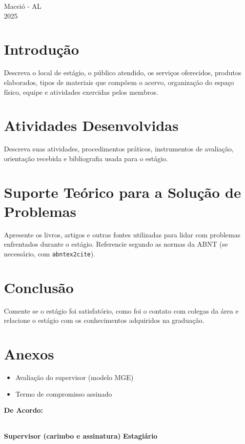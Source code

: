 \documentclass[12pt,a4paper]{article}
\begin{document}
	\vfill
	\begin{flushright}
		Maceió - AL \\
		2025
	\end{flushright}
	
	\newpage
	

	
	\section{Introdução}
	
	Descreva o local de estágio, o público atendido, os serviços oferecidos, produtos elaborados, tipos de materiais que compõem o acervo, organização do espaço físico, equipe e atividades exercidas pelos membros.
	
	\section{Atividades Desenvolvidas}
	
	Descreva suas atividades, procedimentos práticos, instrumentos de avaliação, orientação recebida e bibliografia usada para o estágio.
	
	\section{Suporte Teórico para a Solução de Problemas}
	
	Apresente os livros, artigos e outras fontes utilizadas para lidar com problemas enfrentados durante o estágio. Referencie segundo as normas da ABNT (se necessário, com \texttt{abntex2cite}).
	
	\section{Conclusão}
	
	Comente se o estágio foi satisfatório, como foi o contato com colegas da área e relacione o estágio com os conhecimentos adquiridos na graduação.
	
	\section{Anexos}
	
	\begin{itemize}
		\item Avaliação do supervisor (modelo MGE)
		\item Termo de compromisso assinado
	\end{itemize}
	
	\vspace{2cm}
	\noindent \textbf{De Acordo:}
	
	\vspace{2cm}
	\noindent \underline{\hspace{7cm}} \hfill \underline{\hspace{7cm}} \\
	\textbf{Supervisor (carimbo e assinatura)} \hfill \textbf{Estagiário}
	
\end{document}
